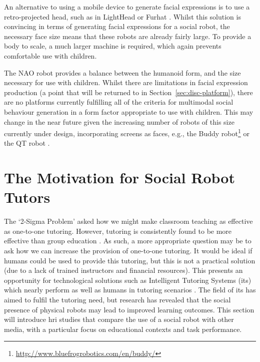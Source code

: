An alternative to using a mobile device to generate facial expressions is to use a retro-projected head, such as in LightHead \citep{delaunay2009towards} or Furhat \citep{al2012furhat}. Whilst this solution is convincing in terms of generating facial expressions for a social robot, the necessary face size means that these robots are already fairly large. To provide a body to scale, a much larger machine is required, which again prevents comfortable use with children. 

The NAO robot provides a balance between the humanoid form, and the size necessary for use with children. Whilst there are limitations in facial expression production (a point that will be returned to in Section~\ref{sec:disc-platform}), there are no platforms currently fulfilling all of the criteria for multimodal social behaviour generation in a form factor appropriate to use with children. This may change in the near future given the increasing number of robots of this size currently under design, incorporating screens as faces, e.g., the Buddy robot\footnote{\url{http://www.bluefrogrobotics.com/en/buddy/}} or the  QT robot \citep{ziafati2017qt}.

\section{The Motivation for Social Robot Tutors}\label{sec:background-tutor}
The `2-Sigma Problem' \citep{bloom1984sigma} asked how we might make classroom teaching as effective as one-to-one tutoring. However, tutoring is consistently found to be more effective than group education \citep{vanlehn2011relative}. As such, a more appropriate question may be to ask how we can increase the provision of one-to-one tutoring. It would be ideal if humans could be used to provide this tutoring, but this is not a practical solution (due to a lack of trained instructors and financial resources). This presents an opportunity for technological solutions such as Intelligent Tutoring Systems (\acrshort{its}) which nearly perform as well as humans in tutoring scenarios \citep{vanlehn2011relative}. The field of \acrshort{its} has aimed to fulfil the tutoring need, but research has revealed that the social presence of physical robots may lead to improved learning outcomes. This section will introduce \acrshort{hri} studies that compare the use of a social robot with other media, with a particular focus on educational contexts and task performance.

